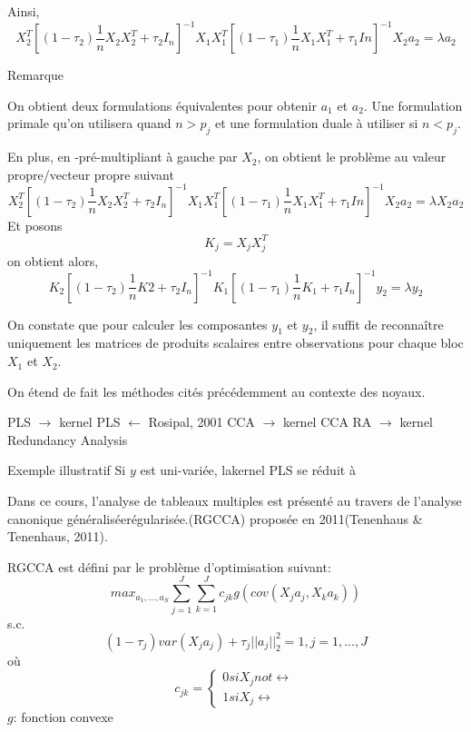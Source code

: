 \documentclass{article}
\begin{document}
Ainsi,
\begin{equation}
X_2^T[(1-\tau_2)\frac{1}{n}X_2X_2^T+\tau_2I_n]^{-1} X_1X_1^T[(1-\tau_1)\frac{1}{n}X_1X_1^T+\tau_1In]^{-1}X_2a_2=\lambda a_2
\end{equation}

Remarque

On obtient deux formulations \'equivalentes pour obtenir $a_1$ et $a_2$. Une formulation primale qu'on utilisera quand $n>p_j$ et une formulation duale \`a utiliser si $n<p_j$.

En plus, en -pr\'e-multipliant \`a gauche par $X_2$, on obtient le probl\`eme au valeur propre/vecteur propre suivant
\begin{equation}
X_2^T[(1-\tau_2)\frac{1}{n}X_2X_2^T+\tau_2I_n]^{-1} X_1X_1^T[(1-\tau_1)\frac{1}{n}X_1X_1^T+\tau_1In]^{-1}X_2a_2=\lambda X_2a_2
\end{equation}
Et posons
\begin{equation}
K_j=X_jX_j^T
\end{equation}
on obtient alors,
\begin{equation}
K_2[(1-\tau_2)\frac{1}{n}K2+\tau_2 I_n]^{-1}K_1 [(1-\tau_1)\frac{1}{n}K_1+\tau_1I_n]^{-1}y_2=\lambda y_2
\end{equation}

On constate que pour calculer les composantes $y_1$ et $y_2$, il suffit de reconna\^itre uniquement les matrices de produits scalaires entre observations pour chaque bloc $X_1$ et $X_2$.

On \'etend de fait les m\'ethodes cit\'es pr\'ec\'edemment au contexte des noyaux.

PLS $\to$ kernel PLS $\leftarrow$ Rosipal, 2001
CCA $\to$ kernel CCA
RA $\to$ kernel Redundancy Analysis


Exemple illustratif
Si $y$ est uni-vari\'ee, lakernel PLS se r\'eduit \`a 

Dans ce cours, l'analyse de tableaux multiples est pr\'esent\'e au travers de l'analyse canonique g\'en\'eralis\'eer\'egularis\'ee.(RGCCA) propos\'ee en 2011(Tenenhaus \& Tenenhaus, 2011).

RGCCA est d\'efini par le probl\`eme d'optimisation suivant:
\begin{equation}
max_{a_1, \ldots,a_S} \sum_{j=1}^J \sum_{k=1}^J c_{jk} g(cov(X_ja_j,X_ka_k))
\end{equation}
s.c.
\begin{equation}
(1-\tau_j) var(X_ja_j)+\tau_j||a_j||_2^2=1,j=1,\ldots,J
\end{equation}
o\`u
\begin{equation}
c_{jk}=\left\{\begin{array}{lll}
0 si X_j not \leftrightarrow \\
1 si X_j \leftrightarrow 
\end{array}\right.
\end{equation}
$g$: fonction convexe
\end{document}
